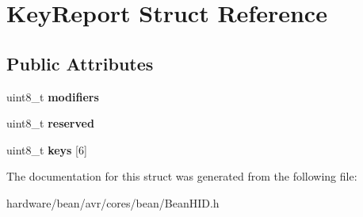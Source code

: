 \hypertarget{struct_key_report}{}\section{Key\+Report Struct Reference}
\label{struct_key_report}
\subsection*{Public Attributes}
\begin{DoxyCompactItemize}
\item 
\hypertarget{struct_key_report_a2ead73d1505b8909d72f07d9b1c2874d}{}uint8\+\_\+t {\bfseries modifiers}\label{struct_key_report_a2ead73d1505b8909d72f07d9b1c2874d}

\item 
\hypertarget{struct_key_report_a47ab672d90ca943f19d552a07a5f2afa}{}uint8\+\_\+t {\bfseries reserved}\label{struct_key_report_a47ab672d90ca943f19d552a07a5f2afa}

\item 
\hypertarget{struct_key_report_a73742ff22b1a767b260633c99baaa374}{}uint8\+\_\+t {\bfseries keys} \mbox{[}6\mbox{]}\label{struct_key_report_a73742ff22b1a767b260633c99baaa374}

\end{DoxyCompactItemize}


The documentation for this struct was generated from the following file\+:\begin{DoxyCompactItemize}
\item 
hardware/bean/avr/cores/bean/Bean\+H\+I\+D.\+h\end{DoxyCompactItemize}
